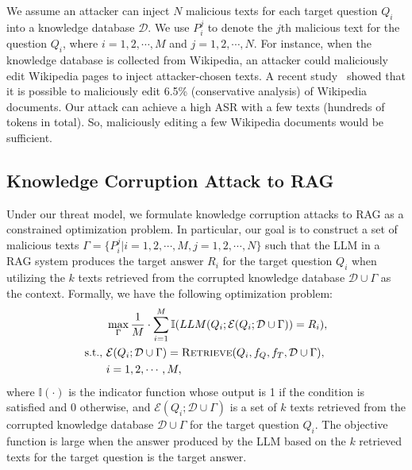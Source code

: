 We assume an attacker can inject $N$ malicious texts for each target question $Q_i$  into a knowledge database $\mathcal{D}$.
We use $P_i^j$ to denote the $j$th malicious text for the question $Q_i$, where $i=1,2,\cdots, M$ and $j=1,2,\cdots, N$.
For instance, when the knowledge database is collected from Wikipedia, an attacker could maliciously edit Wikipedia pages to inject attacker-chosen texts. A recent study~\cite{carlini2023poisoning} showed that it is possible to maliciously edit 6.5\% (conservative analysis) of Wikipedia documents. Our attack can achieve a high ASR with a few texts (hundreds of tokens in total). So, maliciously editing a few Wikipedia documents would be sufficient. 



\subsection{Knowledge Corruption Attack to RAG}
Under our threat model, we formulate knowledge corruption attacks to RAG as a constrained optimization problem. In particular, our goal is to construct a set of malicious texts $\Gamma=\{P_i^j|i=1,2,\cdots, M, j=1,2,\cdots, N\}$ such that the LLM in a RAG system produces the target answer $R_i$ for the target question $Q_i$ when utilizing the $k$ texts retrieved from the corrupted knowledge database $\mathcal{D} \cup \Gamma$ as the context. 
Formally, we have the following optimization problem:
\begin{align}
\label{optimization-problem:0}
   &\max_{\Gamma} \frac{1}{M}\cdot \sum_{i=1}^{M}\mathbb{I}(LLM(Q_i; \mathcal{E}(Q_i; \mathcal{D}\cup \Gamma))=R_i), \\
   \label{optimization-problem:1}
   \text{s.t., }& \mathcal{E}(Q_i; \mathcal{D}\cup \Gamma)= \textsc{Retrieve}(Q_i, f_Q, f_T, \mathcal{D}\cup \Gamma),  
   \\
   \label{optimization-problem:2}
   &i=1,2,\cdots, M, 
\end{align}
where $\mathbb{I}(\cdot)$ is the indicator function whose output is 1 if the condition is satisfied and 0 otherwise, and $\mathcal{E}(Q_i; \mathcal{D}\cup \Gamma)$ is a set of $k$ texts retrieved from the corrupted knowledge database $\mathcal{D}\cup \Gamma$ for the target question $Q_i$. The objective function is large when the answer produced by the LLM based on the $k$ retrieved texts for the target question is the target answer. 




